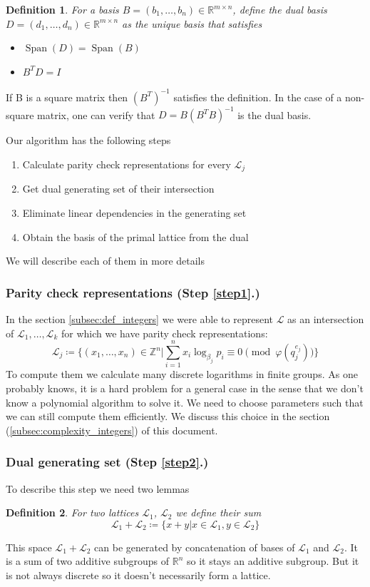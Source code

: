 \documentclass[12pt]{article}
\newcommand{\ZZ}{\mathbb{Z}}
\newcommand{\LL}{\mathcal{L}}
\DeclareMathOperator{\Span}{Span}
\newtheorem{definition}{Definition}
\begin{document}
\begin{definition}\label{def:dual_basis}
    For a basis $B = (b_{1}, \dots, b_{n}) \in \mathbb{R}^{m \times n}$, define the dual basis $D = (d_{1}, \dots, d_{n}) \in \mathbb{R}^{m \times n}$ as the unique basis that satisfies
    \begin{itemize}
        \item $\Span(D) = \Span(B)$
        \item $B^{T}D = I$
    \end{itemize}
\end{definition}
If B is a square matrix then $(B^{T})^{-1}$ satisfies the definition. In the case of a non-square matrix, one can verify that $D = B(B^{T}B)^{-1}$ is the dual basis.

 Our algorithm \label{algorithm} has the following steps
\begin{enumerate}
    \item \label{step1} Calculate parity check representations for every $\LL_{j}$
    \item \label{step2} Get dual generating set of their intersection
    \item \label{step3} Eliminate linear dependencies in the generating set
    \item \label{step4} Obtain the basis of the primal lattice from the dual
\end{enumerate}
We will describe each of them in more details

\subsubsection{Parity check representations (Step \ref{step1}.)}
\label{subsubsec:parity_check_repr}
In the section \ref{subsec:def_integers} we were able to represent $\LL$ as an intersection of $\LL_{1}, \dots, \LL_{k}$ for which we have parity check representations:
\[
    \LL_{j} \coloneqq \{(x_{1}, \dots, x_{n}) \in \ZZ^{n} | \sum_{i=1}^{n}x_{i}\log_{\beta_{j}}p_{i}\equiv 0 \pmod{\varphi(q_{j}^{e_{j}})}\}
\]
To compute them we calculate many discrete logarithms in finite groups. As one probably knows, it is a hard problem for a general case in the sense that we don't know a polynomial algorithm to solve it. We need to choose parameters such that we can still compute them efficiently. We discuss this choice in the section (\ref{subsec:complexity_integers}) of this document.

\subsubsection{Dual generating set (Step \ref{step2}.)}
\label{subsubsec:dual_gen_set}
To describe this step we need two lemmas
\begin{definition}
    For two lattices $\LL_1$, $\LL_2$ we define their sum
\[
    \LL_1 + \LL_2 \coloneqq \{x + y | x \in \LL_1, y \in \LL_2\}
\]
\end{definition}
This space $\LL_{1} + \LL_{2}$ can be generated by concatenation of bases of $\LL_{1}$ and $\LL_{2}$. It is a sum of two additive subgroups of $\mathbb{R}^{n}$ so it stays an additive subgroup. But it is not always discrete so it doesn't necessarily form a lattice.
\end{document}

